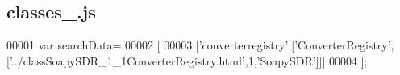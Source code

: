 \subsection{classes\+\_.\+js}
\label{classes__1_8js_source}

\begin{DoxyCode}
00001 var searchData=
00002 [
00003   [\textcolor{stringliteral}{'converterregistry'},[\textcolor{stringliteral}{'ConverterRegistry'},[\textcolor{stringliteral}{'../classSoapySDR\_1\_1ConverterRegistry.html'},1,\textcolor{stringliteral}{'SoapySDR'}]]]
00004 ];
\end{DoxyCode}
